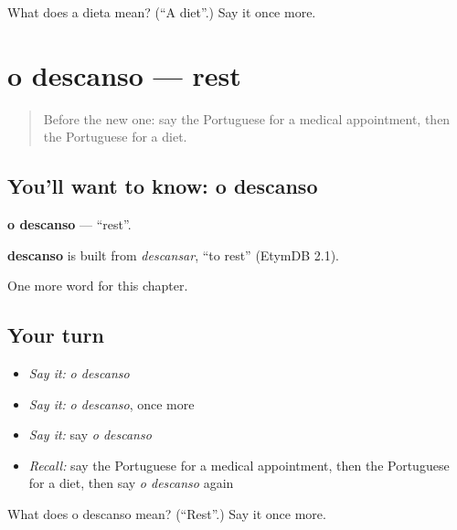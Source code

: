 \begin{tcolorbox}[breakable,colback=teal!4,colframe=teal!35!black,title={Before you move on}]
What does a dieta mean? (\textquotedblleft{}A diet\textquotedblright{}.) Say it once more.
\end{tcolorbox}
\section[o descanso]{o descanso — rest}

\label{lesson:PT-C240-descanso}



\begin{quote}
Before the new one: say the Portuguese for a medical appointment, then the Portuguese for a diet.
\end{quote}

\subsection*{You'll want to know: o descanso}
\textbf{o descanso} — \textquotedblleft{}rest\textquotedblright{}.

\begin{cousinweb}
\textbf{descanso} is built from \emph{descansar}, \textquotedblleft{}to rest\textquotedblright{} (EtymDB 2.1).
\end{cousinweb}

\begin{grammarlens}[title={What you've built}]
One more word for this chapter.
\end{grammarlens}

\subsection*{Your turn}
\begin{itemize}
\raggedright
  \item \emph{Say it:} \emph{o descanso}
  \item \emph{Say it:} \emph{o descanso}, once more
  \item \emph{Say it:} say \emph{o descanso}
  \item \emph{Recall:} say the Portuguese for a medical appointment, then the Portuguese for a diet, then say \emph{o descanso} again
\end{itemize}

\begin{tcolorbox}[breakable,colback=teal!4,colframe=teal!35!black,title={Before you move on}]
What does o descanso mean? (\textquotedblleft{}Rest\textquotedblright{}.) Say it once more.
\end{tcolorbox}
